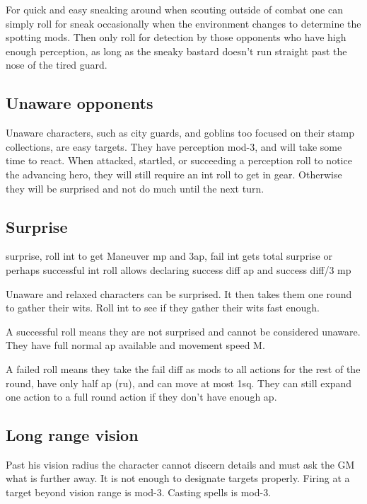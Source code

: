 For quick and easy sneaking around when scouting outside of combat one can simply roll for sneak occasionally when the environment changes to determine the spotting mods. Then only roll for detection by those opponents who have high enough perception, as long as the sneaky bastard doesn't run straight past the nose of the tired guard.


\subsection*{Unaware opponents}
\label{sec:unaware}
Unaware characters, such as city guards, and goblins too focused on their stamp collections, are easy targets. They have perception mod-3, and will take some time to react. When attacked, startled, or succeeding a perception roll to notice the advancing hero, they will still require an int roll to get in gear. Otherwise they will be surprised and not do much until the next turn.


\subsection*{Surprise}
\label{sec:surprise}

\todo surprise, roll int to get Maneuver mp and 3ap, fail int gets total surprise
\todo or perhaps successful int roll allows declaring success diff ap and success diff/3 mp

Unaware and relaxed characters can be surprised. It then takes them one round to gather their wits. Roll int to see if they gather their wits fast enough.

A successful roll means they are not surprised and cannot be considered unaware. They have full normal ap available and movement speed M.

A failed roll means they take the fail diff as mods to all actions for the rest of the round, have only half ap (ru), and can move at most 1sq. They can still expand one action to a full round action if they don't have enough ap.


\subsection*{Long range vision}
Past his vision radius the character cannot discern details and must ask the GM what is further away. It is not enough to designate targets properly. Firing at a target beyond vision range is mod-3. Casting spells is mod-3.

















